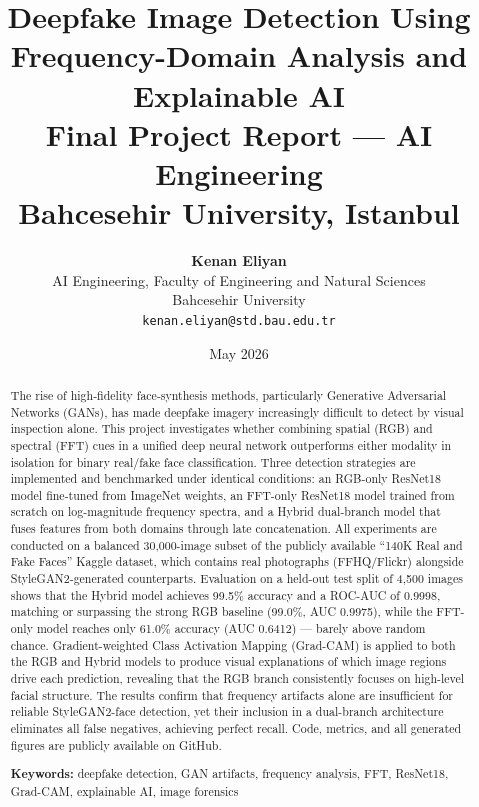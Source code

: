 \documentclass[12pt, a4paper]{article}
\title{%
  \vspace{-1cm}
  \Large\textbf{Deepfake Image Detection Using\\
  Frequency-Domain Analysis and Explainable AI}\\[0.8em]
  \normalsize Final Project Report — AI Engineering\\
  Bahcesehir University, Istanbul
}
\author{%
  \textbf{Kenan Eliyan}\\[0.3em]
  \normalsize AI Engineering, Faculty of Engineering and Natural Sciences\\
  Bahcesehir University\\
  \texttt{kenan.eliyan@std.bau.edu.tr}
}
\date{May 2026}
\begin{document}

\maketitle
\thispagestyle{empty}

\begin{abstract}
\noindent
The rise of high-fidelity face-synthesis methods, particularly Generative
Adversarial Networks (GANs), has made deepfake imagery increasingly difficult to
detect by visual inspection alone.  This project investigates whether combining
spatial (RGB) and spectral (FFT) cues in a unified deep neural network
outperforms either modality in isolation for binary real/fake face
classification.  Three detection strategies are implemented and benchmarked
under identical conditions: an RGB-only ResNet18 model fine-tuned from ImageNet
weights, an FFT-only ResNet18 model trained from scratch on log-magnitude
frequency spectra, and a Hybrid dual-branch model that fuses features from both
domains through late concatenation.  All experiments are conducted on a balanced
30,000-image subset of the publicly available ``140K Real and Fake Faces''
Kaggle dataset, which contains real photographs (FFHQ/Flickr) alongside
StyleGAN2-generated counterparts.  Evaluation on a held-out test split of 4,500
images shows that the Hybrid model achieves 99.5\% accuracy and a ROC-AUC of
0.9998, matching or surpassing the strong RGB baseline (99.0\%, AUC
0.9975), while the FFT-only model reaches only 61.0\% accuracy (AUC 0.6412) —
barely above random chance.  Gradient-weighted Class Activation Mapping
(Grad-CAM) is applied to both the RGB and Hybrid models to produce visual
explanations of which image regions drive each prediction, revealing that the
RGB branch consistently focuses on high-level facial structure.  The results
confirm that frequency artifacts alone are insufficient for reliable
StyleGAN2-face detection, yet their inclusion in a dual-branch architecture
eliminates all false negatives, achieving perfect recall.  Code, metrics, and
all generated figures are publicly available on GitHub.

\smallskip
\noindent\textbf{Keywords:} deepfake detection, GAN artifacts, frequency
analysis, FFT, ResNet18, Grad-CAM, explainable AI, image forensics
\end{abstract}

\newpage
\tableofcontents
\newpage
\end{document}
